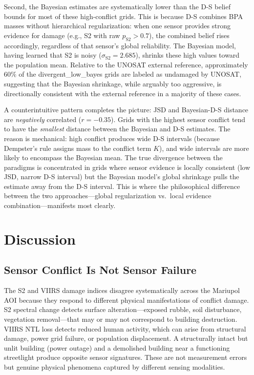 \documentclass[wcp]{jmlr}
\begin{document}
Second, the Bayesian estimates are systematically lower than the D-S
belief bounds for most of these high-conflict grids. This is because D-S
combines BPA masses without hierarchical regularization: when one sensor
provides strong evidence for damage (e.g., S2 with raw $p_{\text{S2}}
>0.7$), the combined belief rises accordingly, regardless of that sensor's
global reliability. The Bayesian model, having learned that S2 is noisy
($\sigma_{\text{S2}} = 2.685$), shrinks these high values toward the
population mean. Relative to the UNOSAT external reference, approximately
$60\%$ of the divergent\_low\_bayes grids are labeled as undamaged by
UNOSAT, suggesting that the Bayesian shrinkage, while arguably too
aggressive, is directionally consistent with the external reference in a
majority of these cases.

A counterintuitive pattern completes the picture: JSD and Bayesian-D-S
distance are \emph{negatively} correlated ($r = -0.35$). Grids with the
highest sensor conflict tend to have the \emph{smallest} distance between
the Bayesian and D-S estimates. The reason is mechanical: high conflict
produces wide D-S intervals (because Dempster's rule assigns mass to the
conflict term $K$), and wide intervals are more likely to encompass the
Bayesian mean. The true divergence between the paradigms is concentrated
in grids where sensor evidence is locally consistent (low JSD, narrow D-S
interval) but the Bayesian model's global shrinkage pulls the estimate away
from the D-S interval. This is where the philosophical difference between
the two approaches---global regularization vs.\ local evidence
combination---manifests most clearly.

\section{Discussion}\label{sec:discussion}

\subsection{Sensor Conflict Is Not Sensor Failure}

The S2 and VIIRS damage indices disagree systematically across the Mariupol
AOI because they respond to different physical manifestations of conflict
damage. S2 spectral change detects surface alteration---exposed rubble,
soil disturbance, vegetation removal---that may or may not correspond to
building destruction. VIIRS NTL loss detects reduced human activity, which
can arise from structural damage, power grid failure, or population
displacement. A structurally intact but unlit building (power outage) and a
demolished building near a functioning streetlight produce opposite
sensor signatures. These are not measurement errors but genuine
physical phenomena captured by different sensing modalities.
\end{document}
